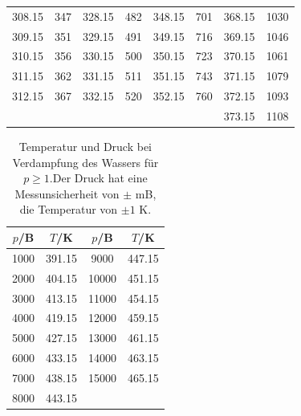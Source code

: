 \begin{table}[H]
\begin{tabular}{
  c c||c c||c c||c c
}
308.15  & 347  & 328.15  & 482  & 348.15  & 701  & 368.15  & 1030\\
309.15  & 351  & 329.15  & 491  & 349.15  & 716  & 369.15  & 1046\\
310.15  & 356  & 330.15  & 500  & 350.15  & 723  & 370.15  & 1061\\
311.15  & 362  & 331.15  & 511  & 351.15  & 743  & 371.15  & 1079\\
312.15  & 367  & 332.15  & 520  & 352.15  & 760  & 372.15  & 1093\\
      &   &       &       &       &      & 373.15  & 1108 \\
\bottomrule
\end{tabular}
\end{table}
\begin{table}[H]
  \centering
  \caption{Temperatur und Druck bei Verdampfung des Wassers für $p\geq 1$.Der Druck hat eine Messunsicherheit von
  $\pm$ mB, die Temperatur von $\pm 1$ K.}
  \label{tab:Messreihe_2}
\begin{tabular}{
  c c||c c
}
\toprule 
$p$/B & $T$/K & $p$/B & $T$/K\\
\midrule
1000  & 391.15 & 9000  & 447.15\\
2000  & 404.15 & 10000 & 451.15\\
3000  & 413.15 & 11000 & 454.15\\
4000  & 419.15 & 12000 & 459.15\\
5000  & 427.15 & 13000 & 461.15\\
6000  & 433.15 & 14000 & 463.15\\
7000  & 438.15 & 15000 & 465.15\\
8000  & 443.15 &       &      \\
\bottomrule
\end{tabular}
\end{table}

